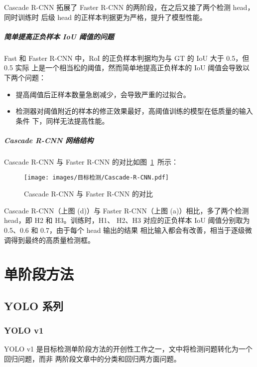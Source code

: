 Cascade R-CNN 拓展了 Faster R-CNN 的两阶段，在之后又接了两个检测 head，同时训练时
后级 head 的正样本判据更为严格，提升了模型性能。

\paragraph{简单提高正负样本 IoU 阈值的问题}
Fast 和 Faster R-CNN 中，RoI 的正负样本判据均为与 GT 的 IoU 大于 0.5，但 0.5 实际
上是一个相当松的阈值，然而简单地提高正负样本的 IoU 阈值会导致以下两个问题：

\begin{itemize}
  \item 提高阈值后正样本数量急剧减少，会导致严重的过拟合。
  \item 检测器对阈值附近的样本的修正效果最好，高阈值训练的模型在低质量的输入条件
    下，同样无法提高性能。
\end{itemize}

\paragraph{Cascade R-CNN 网络结构}
Cascade R-CNN 与 Faster R-CNN 的对比如图~\ref{fig:Cascade-RCNN}~所示：

\begin{figure}[ht]
  \centering
  \texttt{[image: images/目标检测/Cascade-R-CNN.pdf]}
  \caption{Cascade R-CNN 与 Faster R-CNN 的对比}\label{fig:Cascade-RCNN}
\end{figure}

Cascade R-CNN（上图 (d)）与 Faster R-CNN（上图 (a)）相比，多了两个检测 head，即 H2 和 H3。训练时，H1、
H2、H3 对应的正负样本 IoU 阈值分别取为 0.5、0.6 和 0.7，由于每个 head 输出的结果
相比输入都会有改善，相当于逐级微调得到最终的高质量检测框。

\chapter{单阶段方法}

\section{YOLO 系列}\label{sec:YOLO}

\subsection{YOLO v1}\label{subsec:YOLOv1}
YOLO v1 是目标检测单阶段方法的开创性工作之一，文中将检测问题转化为一个回归问题，而非
两阶段文章中的分类和回归两方面问题。

